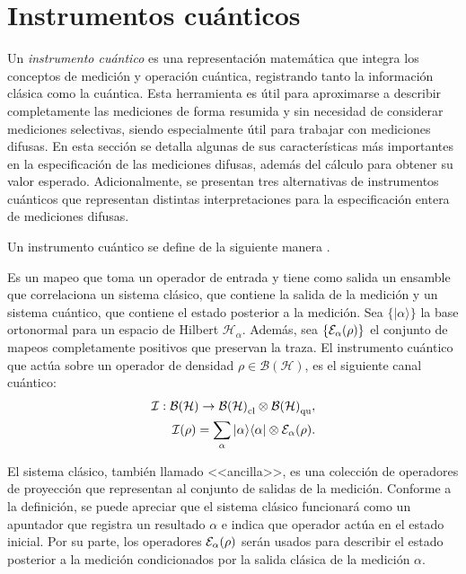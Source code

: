\section{Instrumentos cuánticos}\label{sec:cap2instrumentos-cuanticos} %

Un \textit{instrumento cuántico} es una representación matemática que integra
los conceptos de medición y operación cuántica, registrando tanto la
información clásica como la cuántica. Esta herramienta es útil para aproximarse
a describir completamente las mediciones de forma resumida y sin necesidad de
considerar mediciones selectivas, siendo especialmente útil para trabajar con
mediciones difusas. En esta sección se detalla algunas de sus características
más importantes en la especificación de las mediciones difusas, además del
cálculo para obtener su valor esperado.  Adicionalmente, se presentan tres
alternativas de instrumentos cuánticos que representan distintas
interpretaciones para la especificación entera de mediciones difusas.


Un instrumento cuántico se define de la siguiente manera
{\cite{wilde2011classical}}.\begin{definition}
Es un mapeo que toma un operador de entrada y tiene como salida un ensamble que
correlaciona un sistema clásico, que contiene la salida de la medición y un
sistema cuántico, que contiene el estado posterior a la medición.  Sea
$\{|\alpha\rangle \}$ la base ortonormal para un espacio de Hilbert
$\mathcal{H}_{\alpha}$. Además, sea $\{\mathcal{E}_\alpha(\rho)\}$ el conjunto de mapeos
completamente positivos que preservan la traza. El instrumento
cuántico que actúa sobre un operador de densidad $\rho \in \mathcal{B(H)}$, es
el siguiente canal cuántico: 
\begin{equation}
    \begin{split}
        \mathcal{I}: \mathcal{B(H)}\rightarrow\mathcal{B(H)}_{\text{cl}}\otimes \mathcal{B(H)}_{\text{qu}},\\
    \mathcal{I}(\rho)=\sum_\alpha |\alpha\rangle \langle\alpha|\otimes \mathcal{E}_\alpha(\rho).
    \end{split}
\end{equation}
\end{definition}
El sistema clásico, también llamado <<ancilla>>, es una colección de operadores
de proyección que representan al conjunto de salidas de la medición. Conforme a
la definición, se puede apreciar que el sistema clásico funcionará como un
apuntador que registra un resultado $\alpha$ e indica que operador actúa en el
estado inicial. Por su parte, los operadores $\mathcal{E}_\alpha(\rho)$ serán usados
para describir  el estado posterior a la medición condicionados por la salida
clásica de la medición $\alpha$.


